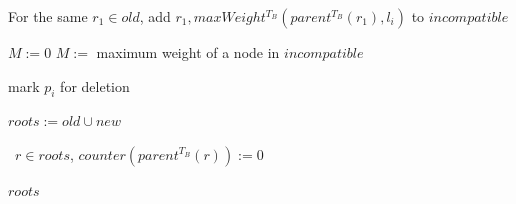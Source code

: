 \documentclass{article}
\begin{document}
\begin{algorithm}[ht]
\begin{algorithmic}[1]
                    \State For the same $r_1 \in old$, add $r_1, maxWeight^{T_B}(parent^{T_B}(r_1), l_i)$ to $incompatible$
                \EndIf

                    {$M := 0$}
                    $M :=$ maximum weight of a node in $incompatible$

                    mark $p_i$ for deletion

                \State $roots := old \cup new$
            \EndFor

            \State \algorithmicforall\ $r \in roots$, $counter(parent^{T_B}(r)) := 0$

            \State \Return $roots$
        \end{algorithmic}
    \end{algorithm}
\end{document}
